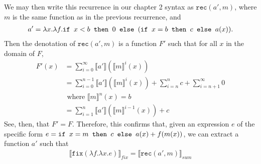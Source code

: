 We may then write this recurrence in our chapter 2 syntax as $\texttt{rec}(a',m)$, where $m$ is the same function
as in the previous recurrence, and
\begin{align*}
a' = \lambda x.\lambda f. \texttt{if } x < b \texttt{ then } 0 \texttt{ else } (\texttt{if } x = b \texttt{ then } c \texttt{ else } a(x)).
\end{align*}
Then the denotation of $\texttt{rec}(a',m)$ is a function $F'$ such that for all $x$ in the domain of $F$, 
\begin{align*}
F'(x) &= \sum_{i=0}^{\infty} \llbracket a' \rrbracket(\llbracket m \rrbracket^i(x)) \\
&= \sum_{i=0}^{n-1} \llbracket a' \rrbracket( \llbracket m \rrbracket^i(x)) + \sum_{i=n}^n c + \sum_{i = n+1}^{\infty} 0 \\
&\text{ where } \llbracket m \rrbracket^n(x) = b \\
&= \sum_{i=1}^{n}\llbracket a' \rrbracket ( \llbracket m \rrbracket^{i-1}(x)) + c
\end{align*}
See, then, that $F' = F$. Therefore, this confirms that, given an expression $e$ of the specific form
$e = \texttt{if } x = m \texttt{ then } c \texttt{ else } a(x) + f(m(x))$, we can extract a function $a'$ such that 
\begin{align*}
\llbracket \texttt{fix}(\lambda f. \lambda x.e) \rrbracket_{fix} = \llbracket \texttt{rec}(a',m)\rrbracket_{sum}
\end{align*}





 